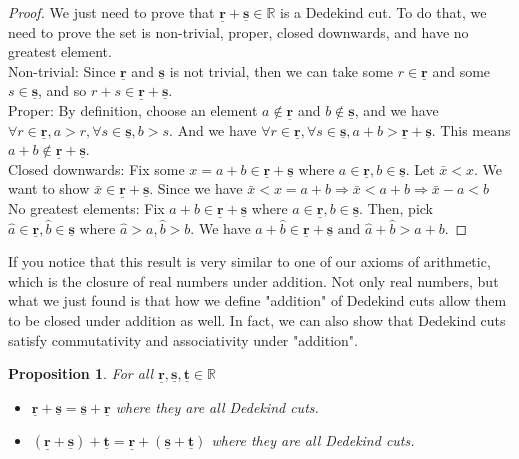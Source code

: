 \documentclass{book}
\newtheorem{proposition}[theorem]{Proposition}
\begin{document}
\begin{proof}
    We just need to prove that $\underline{\mathbf{r}} + \underline{\mathbf{s}} \in \mathbb{R}$ is a Dedekind cut. To do that, we need to prove the set is non-trivial, proper, closed downwards, and have no greatest element. \\
    Non-trivial: Since $\underline{\mathbf{r}}$ and $\underline{\mathbf{s}}$ is not trivial, then we can take some $r \in \underline{\mathbf{r}}$ and some $s \in \underline{\mathbf{s}}$, and so $r + s \in \underline{\mathbf{r}} + \underline{\mathbf{s}}$. \\
    Proper: By definition, choose an element $a \notin \underline{\mathbf{r}}$ and $b \notin \underline{\mathbf{s}}$, and we have $\forall r \in \underline{\mathbf{r}}, a > r, \forall s \in \underline{\mathbf{s}}, b > s$. And we have $\forall r \in \underline{\mathbf{r}}, \forall s \in \underline{\mathbf{s}}, a + b > \underline{\mathbf{r}} + \underline{\mathbf{s}}$. This means $a + b \notin \underline{\mathbf{r}} + \underline{\mathbf{s}}$. \\
    Closed downwards: Fix some $x = a + b \in \underline{\mathbf{r}} + \underline{\mathbf{s}}$ where $a \in \underline{\mathbf{r}}, b \in \underline{\mathbf{s}}$. Let $\bar{x} < x$. We want to show $\bar{x} \in \underline{\mathbf{r}} + \underline{\mathbf{s}}$. Since we have $\bar{x} < x = a + b \Rightarrow \bar{x} < a + b \Rightarrow \bar{x} - a < b$ \\
    No greatest elements: Fix $a + b \in \underline{\mathbf{r}} + \underline{\mathbf{s}}$ where $a \in \underline{\mathbf{r}}, b \in \underline{\mathbf{s}}$. Then, pick $\hat{a} \in \underline{\mathbf{r}}, \hat{b} \in \underline{\mathbf{s}} \text{ where } \hat{a} > a, \hat{b} > b$. We have $\hat{a} + \hat{b} \in \underline{\mathbf{r}} + \underline{\mathbf{s}} \text{ and } \hat{a} + \hat{b} > a + b$.
\end{proof}

If you notice that this result is very similar to one of our axioms of arithmetic, which is the closure of real numbers under addition. Not only real numbers, but what we just found is that how we define "addition" of Dedekind cuts allow them to be closed under addition as well. In fact, we can also show that Dedekind cuts satisfy commutativity and associativity under "addition".

\begin{proposition} \label{Proposition 1.8.6}
    For all $\underline{\mathbf{r}}, \underline{\mathbf{s}}, \underline{\mathbf{t}} \in \mathbb{R}$
    \begin{itemize}
        \item[(1)] $\underline{\mathbf{r}} + \underline{\mathbf{s}} = \underline{\mathbf{s}} + \underline{\mathbf{r}}$ where they are all Dedekind cuts.
        \item[(2)] $(\underline{\mathbf{r}} + \underline{\mathbf{s}}) + \underline{\mathbf{t}} = \underline{\mathbf{r}} + (\underline{\mathbf{s}} + \underline{\mathbf{t}})$ where they are all Dedekind cuts.
    \end{itemize}
\end{proposition}
\end{document}
